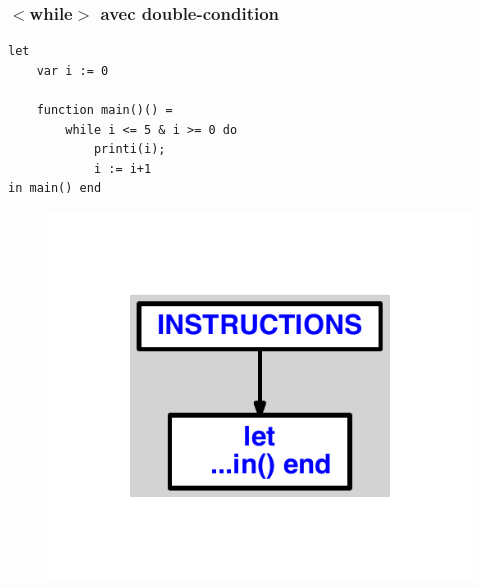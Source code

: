 \documentclass{article}
\begin{document}
\subsubsection{$ < $while$ > $ avec double-condition}
\begin{lstlisting}
let
	var i := 0

	function main()() =
		while i <= 5 & i >= 0 do
			printi(i);
			i := i+1
in main() end
\end{lstlisting}
\newpage
\begin{figure}[H]
\centering
\includegraphics[max width=\textwidth]{ast/ast_331.pdf}
\end{figure}
\newpage
\end{document}
